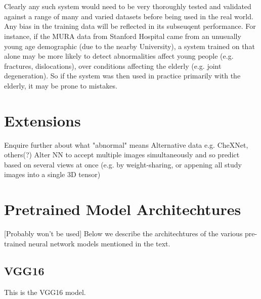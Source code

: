\documentclass[11pt]{article} %
\theoremstyle{plain}
\theoremstyle{definition}
\begin{document}
\\
\\
\noindent
Clearly any such system would need to be very thoroughly tested and validated against a range of many and varied datasets before being used in the real world. Any bias in the training data will be reflected in its subseuqent performance. For instance, if the MURA data from Stanford Hospital came from an unusually young age demographic (due to the nearby University), a system trained on that alone may be more likely to detect abnormalities affect young people (e.g. fractures, dislocations), over conditions affecting the elderly (e.g. joint degeneration). So if the system was then used in practice primarily with the elderly, it may be prone to mistakes.


\newpage
\section{Extensions}
Enquire further about what "abnormal" means
Alternative data e.g. CheXNet, others(?)
Alter NN to accept multiple images simultaneously and so predict based on several views at once (e.g. by weight-sharing, or appening all study images into a single 3D tensor)




\clearpage



\clearpage
\appendix
\section{Pretrained Model Architechtures}
[Probably won't be used]
Below we describe the architechtures of the various pre-trained neural network models mentioned in the text.
\subsection{VGG16}
This is the VGG16 model.

\newpage
\end{document}

